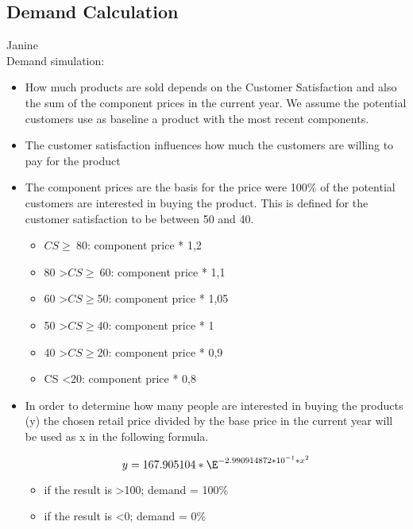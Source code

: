 \subsection{Demand Calculation}
Janine \\
Demand simulation: 
\begin{itemize}
\item How much products are sold depends on the Customer Satisfaction and also the sum of the component prices in the current year. We assume the potential customers use as baseline a product with the most recent components. 
\item The customer satisfaction influences how much the customers are willing to pay for the product 
\item The component prices are the basis for the price were 100\% of the potential customers are interested in buying the product. This is defined for the customer satisfaction to be between 50 and 40.

\begin{itemize}
\item $CS \geq \ $80: component price * 1,2 
\item 80 \textgreater $CS \geq \ $60: component price * 1,1
\item 60 \textgreater $CS \geq $50: component price * 1,05
\item 50 \textgreater $CS \geq $40: component price * 1
\item 40 \textgreater $CS \geq $20: component price * 0,9
\item CS \textless 20: component price * 0,8
\end{itemize}

\item In order to determine how many people are interested in buying the products (y) the chosen retail price divided by the base price in the current year will be used as x in the following formula.

\begin{equation}
    y = 167.905104 * \E^{ -2.990914872 * 10^{ -1 } * x^{ 2 }}
\end{equation}

\begin{itemize}
    \item if the result is \textgreater 100; demand = 100\%
    \item if the result is \textless 0; demand = 0\%
\end{itemize}
\end{itemize}